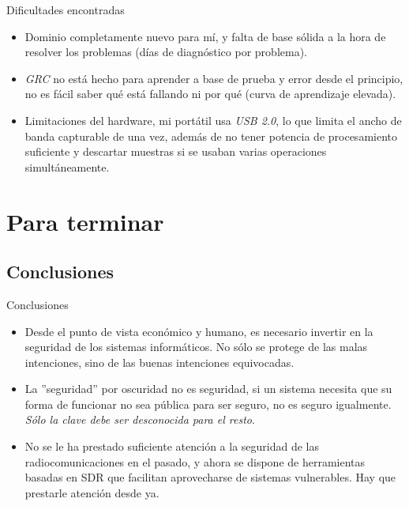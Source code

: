 \documentclass{beamer}
\begin{document}
\begin{frame}{Dificultades encontradas}

\begin{itemize}
	\item Dominio completamente nuevo para mí, y falta de base sólida a la hora de resolver los problemas (días de diagnóstico por problema).
	\item \emph{GRC} no está hecho para aprender a base de prueba y error desde el principio, no es fácil saber qué está fallando ni por qué (curva de aprendizaje elevada).
	\item Limitaciones del hardware, mi portátil usa \emph{USB 2.0}, lo que limita el ancho de banda capturable de una vez, además de no tener potencia de procesamiento suficiente y descartar muestras si se usaban varias operaciones simultáneamente.
\end{itemize}


\end{frame}

\section{Para terminar}

\subsection{Conclusiones}

\begin{frame}{Conclusiones}

\begin{itemize}
	\item Desde el punto de vista económico y humano, es necesario invertir en la seguridad de los sistemas informáticos. No sólo se protege de las malas intenciones, sino de las buenas intenciones equivocadas.
	\item La ''seguridad'' por oscuridad no es seguridad, si un sistema necesita que su forma de funcionar no sea pública para ser seguro, no es seguro igualmente. \emph{Sólo la clave debe ser desconocida para el resto}.
	\item No se le ha prestado suficiente atención a la seguridad de las radiocomunicaciones en el pasado, y ahora se dispone de herramientas basadas en SDR que facilitan aprovecharse de sistemas vulnerables. Hay que prestarle atención desde ya.
\end{itemize}

\end{frame}
\end{document}
